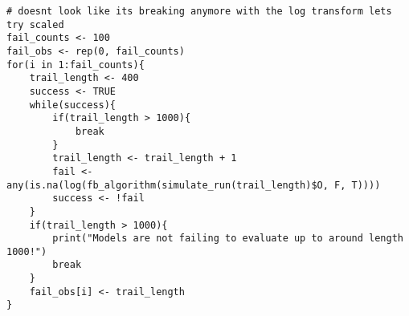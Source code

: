 \documentclass{article} %
\begin{document}
\begin{enumerate}
\begin{verbatim}
# doesnt look like its breaking anymore with the log transform lets try scaled
fail_counts <- 100
fail_obs <- rep(0, fail_counts)
for(i in 1:fail_counts){
    trail_length <- 400
    success <- TRUE
    while(success){
        if(trail_length > 1000){
            break
        }
        trail_length <- trail_length + 1
        fail <- any(is.na(log(fb_algorithm(simulate_run(trail_length)$O, F, T))))
        success <- !fail
    }
    if(trail_length > 1000){
        print("Models are not failing to evaluate up to around length 1000!")
        break
    }
    fail_obs[i] <- trail_length
}
\end{verbatim}

\end{enumerate}
\end{document}
